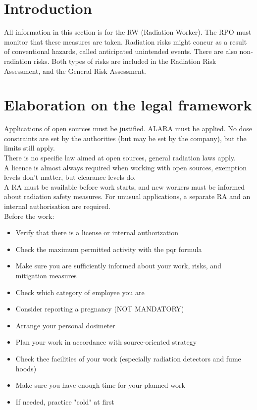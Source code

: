 \section{Introduction}
All information in this section is for the RW (Radiation Worker). The RPO must monitor that these measures are taken. Radiation risks might concur as a result of conventional hazards, called anticipated unintended events. There are also non-radiation risks. Both types of risks are included in the Radiation Risk Assessment, and the General Risk Assessment. 
\section{Elaboration on the legal framework}
Applications of open sources must be justified. ALARA must be applied. No dose constraints are set by the authorities (but may be set by the company), but the limits still apply.\\
There is no specific law aimed at open sources, general radiation laws apply.\\
A licence is almost always required when working with open sources, exemption levels don't matter, but clearance levels do.\\
A RA must be available before work starts, and new workers must be informed about radiation safety measures. For unusual applications, a separate RA and an internal authorisation are required.\\
Before the work: 
\begin{itemize}
    \item Verify that there is a license or internal authorization
    \item Check the maximum permitted activity with the pqr formula
    \item Make sure you are sufficiently informed about your work, risks, and mitigation measures
    \item Check which category of employee you are
    \item Consider reporting a pregnancy (NOT MANDATORY)
    \item Arrange your personal dosimeter
    \item Plan your work in accordance with source-oriented strategy
    \item Check thee facilities of your work (especially radiation detectors and fume hoods)
    \item Make sure you have enough time for your planned work
    \item If needed, practice "cold" at first
\end{itemize}
